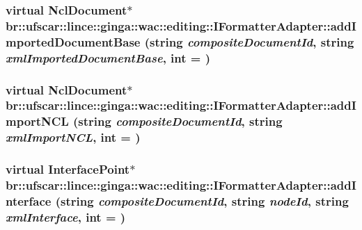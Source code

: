 \label{classbr_1_1ufscar_1_1lince_1_1ginga_1_1wac_1_1editing_1_1IFormatterAdapter_ad9633e31a4cf3ec03f2e98cbad6567e3}
\hypertarget{classbr_1_1ufscar_1_1lince_1_1ginga_1_1wac_1_1editing_1_1IFormatterAdapter_a0fe84bf645231f3b73a05ccb32ebf7a5}{
\subsubsection[{addImportedDocumentBase}]{\setlength{\rightskip}{0pt plus 5cm}virtual NclDocument$\ast$ br::ufscar::lince::ginga::wac::editing::IFormatterAdapter::addImportedDocumentBase (string {\em compositeDocumentId}, \/  string {\em xmlImportedDocumentBase}, \/  int = {})}}
\label{classbr_1_1ufscar_1_1lince_1_1ginga_1_1wac_1_1editing_1_1IFormatterAdapter_a0fe84bf645231f3b73a05ccb32ebf7a5}
\hypertarget{classbr_1_1ufscar_1_1lince_1_1ginga_1_1wac_1_1editing_1_1IFormatterAdapter_aa41fa59a974389ee0f4ada5194210140}{
\subsubsection[{addImportNCL}]{\setlength{\rightskip}{0pt plus 5cm}virtual NclDocument$\ast$ br::ufscar::lince::ginga::wac::editing::IFormatterAdapter::addImportNCL (string {\em compositeDocumentId}, \/  string {\em xmlImportNCL}, \/  int = {})}}
\label{classbr_1_1ufscar_1_1lince_1_1ginga_1_1wac_1_1editing_1_1IFormatterAdapter_aa41fa59a974389ee0f4ada5194210140}
\hypertarget{classbr_1_1ufscar_1_1lince_1_1ginga_1_1wac_1_1editing_1_1IFormatterAdapter_ad7ba323796468d38356e6fe8a22b2f89}{
\subsubsection[{addInterface}]{\setlength{\rightskip}{0pt plus 5cm}virtual InterfacePoint$\ast$ br::ufscar::lince::ginga::wac::editing::IFormatterAdapter::addInterface (string {\em compositeDocumentId}, \/  string {\em nodeId}, \/  string {\em xmlInterface}, \/  int = {})}}
